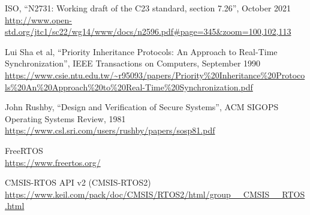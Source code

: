 \documentclass[11pt,letterpaper,twoside,openany]{book}
\begin{document}
\begin{thebibliography}{9}
ISO, ``N2731: Working draft of the C23 standard, section 7.26'', October 2021 \\
\url{http://www.open-std.org/jtc1/sc22/wg14/www/docs/n2596.pdf#page=345&zoom=100,102,113}

Lui Sha et al, ``Priority Inheritance Protocols: An Approach to Real-Time Synchronization'', IEEE Transactions on Computers, September 1990 \\
\url{https://www.csie.ntu.edu.tw/~r95093/papers/Priority%20Inheritance%20Protocols%20An%20Approach%20to%20Real-Time%20Synchronization.pdf}

John Rushby, ``Design and Verification of Secure Systems'', ACM SIGOPS Operating Systems Review, 1981 \\
\url{https://www.csl.sri.com/users/rushby/papers/sosp81.pdf}

FreeRTOS \\
\url{https://www.freertos.org/}

CMSIS-RTOS API v2 (CMSIS-RTOS2) \\
\url{https://www.keil.com/pack/doc/CMSIS/RTOS2/html/group__CMSIS__RTOS.html}

\end{thebibliography}
\end{document}

